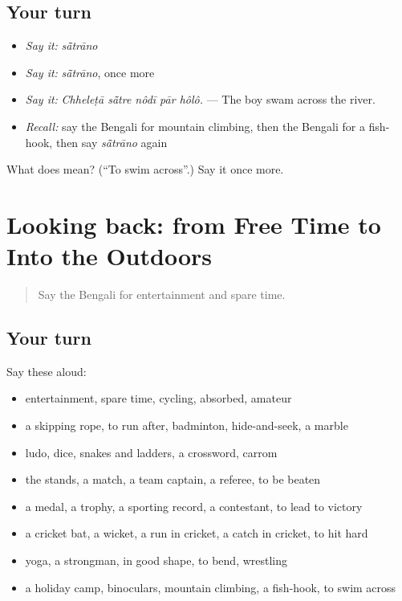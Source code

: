 \subsection*{Your turn}
\begin{itemize}
\raggedright
  \item \emph{Say it:} \emph{sā̃trāno}
  \item \emph{Say it:} \emph{sā̃trāno}, once more
  \item \emph{Say it:} \emph{Chheleṭā sā̃tre nôdī pār hôlô.} — The boy swam across the river.
  \item \emph{Recall:} say the Bengali for mountain climbing, then the Bengali for a fish-hook, then say \emph{sā̃trāno} again
\end{itemize}

\begin{tcolorbox}[breakable,colback=teal!4,colframe=teal!35!black,title={Before you move on}]
What does  mean? (\textquotedblleft{}To swim across\textquotedblright{}.) Say it once more.
\end{tcolorbox}
\section[(dialogue)]{Looking back: from Free Time to Into the Outdoors}

\label{lesson:BN-R523-review-516-523}



\begin{quote}
Say the Bengali for entertainment and spare time.
\end{quote}

\subsection*{Your turn}
Say these aloud:

\begin{itemize}
\raggedright
  \item entertainment, spare time, cycling, absorbed, amateur
  \item a skipping rope, to run after, badminton, hide-and-seek, a marble
  \item ludo, dice, snakes and ladders, a crossword, carrom
  \item the stands, a match, a team captain, a referee, to be beaten
  \item a medal, a trophy, a sporting record, a contestant, to lead to victory
  \item a cricket bat, a wicket, a run in cricket, a catch in cricket, to hit hard
  \item yoga, a strongman, in good shape, to bend, wrestling
  \item a holiday camp, binoculars, mountain climbing, a fish-hook, to swim across
\end{itemize}

